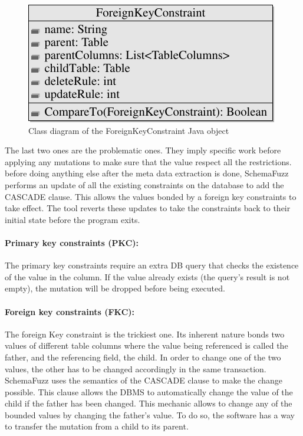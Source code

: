 \documentclass{article}
\begin{document}
\begin{empfile}
\begin{figure} [h!]
\centering
\includegraphics[width=\textwidth]{ForeignKeyClassDiagram-1.pdf}
\caption{Class diagram of the ForeignKeyConstraint Java object}
\end{figure}

\bigskip

The last two ones are the problematic ones. They imply specific work before applying any mutations to make sure that the value respect all the restrictions. before doing anything else after the meta data extraction is done, SchemaFuzz performs an update of all the existing constraints on the database to add the CASCADE clause. This allows the values bonded by a foreign key constraints to take effect. The tool reverts these updates to take the constraints back to their initial state before the program exits.
				\paragraph{Primary key constraints (PKC):}
The primary key constraints require an extra DB query that checks the existence of the value in the column. If the value already exists (the query's result is not empty), the mutation will be dropped before being executed.
				\paragraph{Foreign key constraints (FKC):}
The foreign Key constraint is the trickiest one. Its inherent nature bonds two values of different table columns where the value being referenced is called the father, and the referencing field, the child. In order to change one of the two values, the other has to be changed accordingly in the same transaction. SchemaFuzz uses the semantics of the CASCADE clause to make the change possible. This clause allows the DBMS to automatically change the value of the child if the father has been changed.
This mechanic allows to change any of the bounded values by changing the father's value.
To do so, the software has a way to transfer the mutation from a child to its parent.


\end{empfile}
\end{document}
